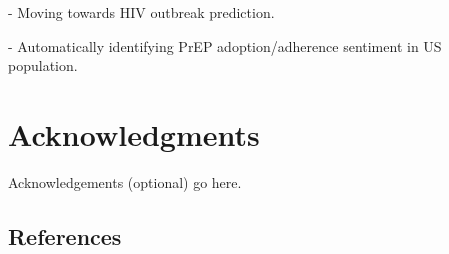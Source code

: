 \documentclass{sig-alternate-05-2015}
\begin{document}
- Moving towards HIV outbreak prediction. 

- Automatically identifying PrEP adoption/adherence sentiment in US population.




\section{Acknowledgments}

Acknowledgements (optional) go here.

%

%
%


\subsection{References}
\end{document}
